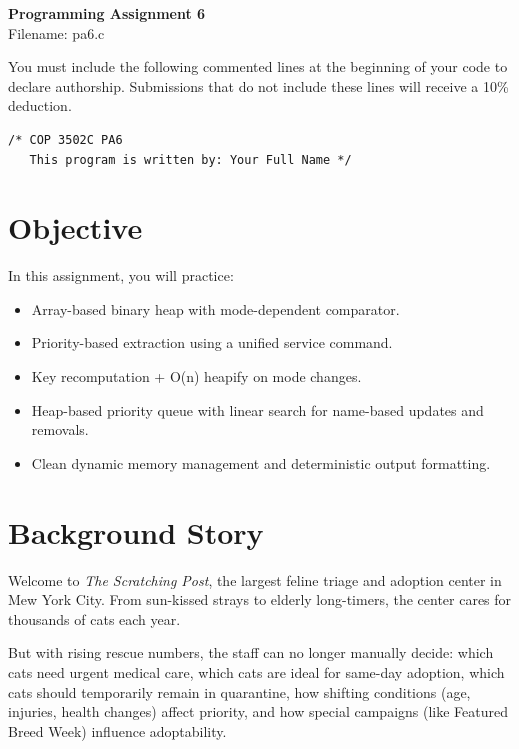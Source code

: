 \documentclass[11pt]{article}
\begin{document}
\begin{center}
    {\Huge \textsf{\textbf{Programming Assignment 6}}} \\
    \vspace{5pt}
    {\large \textsf{Filename: pa6.c}} \\
    \vspace{10pt}
\end{center}

\begin{importantbox}
    You must include the following commented lines at the beginning of your code to declare authorship. Submissions that do not include these lines will receive a 10\% deduction.
    \begin{verbatim}
/* COP 3502C PA6
   This program is written by: Your Full Name */
    \end{verbatim}
\end{importantbox}

\section*{Objective}
In this assignment, you will practice:
\begin{itemize}
    \item Array-based binary heap with mode-dependent comparator.
    \item Priority-based extraction using a unified service command.
    \item Key recomputation + O(n) heapify on mode changes.
    \item Heap-based priority queue with linear search for name-based updates and removals.
    \item Clean dynamic memory management and deterministic output formatting.
\end{itemize}

\section*{Background Story}
Welcome to \textit{The Scratching Post}, the largest feline triage and adoption center in Mew York City. From sun-kissed strays to elderly long-timers, the center cares for thousands of cats each year.

But with rising rescue numbers, the staff can no longer manually decide: which cats need urgent medical care, which cats are ideal for same-day adoption, which cats should temporarily remain in quarantine, how shifting conditions (age, injuries, health changes) affect priority, and how special campaigns (like Featured Breed Week) influence adoptability.
\end{document}
